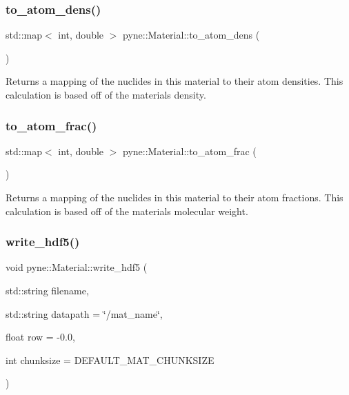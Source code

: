 \subsubsection{\texorpdfstring{to\+\_\+atom\+\_\+dens()}{to\_atom\_dens()}}
{\footnotesize\ttfamily std\+::map$<$ int, double $>$ pyne\+::\+Material\+::to\+\_\+atom\+\_\+dens (\begin{DoxyParamCaption}{ }\end{DoxyParamCaption})}

Returns a mapping of the nuclides in this material to their atom densities. This calculation is based off of the material\textquotesingle{}s density. \mbox{\label{classpyne_1_1_material_a89a5ef5a4bfca961981a46a4252299fd}} 
\subsubsection{\texorpdfstring{to\+\_\+atom\+\_\+frac()}{to\_atom\_frac()}}
{\footnotesize\ttfamily std\+::map$<$ int, double $>$ pyne\+::\+Material\+::to\+\_\+atom\+\_\+frac (\begin{DoxyParamCaption}{ }\end{DoxyParamCaption})}

Returns a mapping of the nuclides in this material to their atom fractions. This calculation is based off of the material\textquotesingle{}s molecular weight. \mbox{\label{classpyne_1_1_material_a29d43da68021be93d8d1d1e9915e1179}} 
\subsubsection{\texorpdfstring{write\+\_\+hdf5()}{write\_hdf5()}}
{\footnotesize\ttfamily void pyne\+::\+Material\+::write\+\_\+hdf5 (\begin{DoxyParamCaption}\item[{std\+::string}]{filename,  }\item[{std\+::string}]{datapath = {\ttfamily \char`\"{}/mat\+\_\+name\char`\"{}},  }\item[{float}]{row = {\ttfamily -\/0.0},  }\item[{int}]{chunksize = {\ttfamily DEFAULT\+\_\+MAT\+\_\+CHUNKSIZE} }\end{DoxyParamCaption})}

